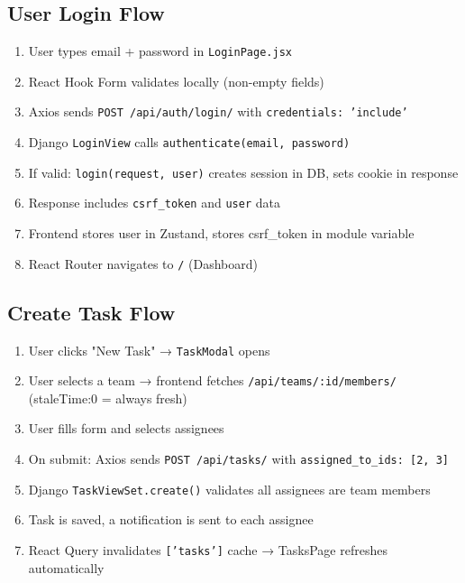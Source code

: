 \documentclass[12pt,a4paper]{article}
\begin{document}
\subsection{User Login Flow}
\begin{enumerate}
    \item User types email + password in \texttt{LoginPage.jsx}
    \item React Hook Form validates locally (non-empty fields)
    \item Axios sends \texttt{POST /api/auth/login/} with \texttt{credentials: 'include'}
    \item Django \texttt{LoginView} calls \texttt{authenticate(email, password)}
    \item If valid: \texttt{login(request, user)} creates session in DB, sets cookie in response
    \item Response includes \texttt{csrf\_token} and \texttt{user} data
    \item Frontend stores user in Zustand, stores csrf\_token in module variable
    \item React Router navigates to \texttt{/} (Dashboard)
\end{enumerate}

\subsection{Create Task Flow}
\begin{enumerate}
    \item User clicks "New Task" → \texttt{TaskModal} opens
    \item User selects a team → frontend fetches \texttt{/api/teams/:id/members/} (staleTime:0 = always fresh)
    \item User fills form and selects assignees
    \item On submit: Axios sends \texttt{POST /api/tasks/} with \texttt{assigned\_to\_ids: [2, 3]}
    \item Django \texttt{TaskViewSet.create()} validates all assignees are team members
    \item Task is saved, a notification is sent to each assignee
    \item React Query invalidates \texttt{['tasks']} cache → TasksPage refreshes automatically
\end{enumerate}
\end{document}
